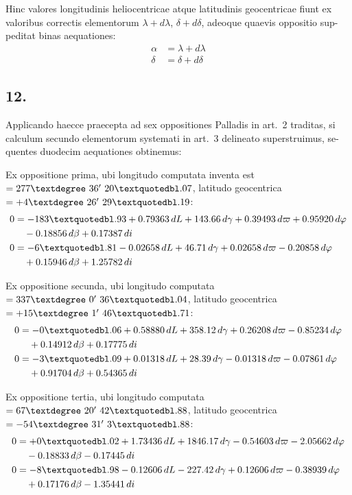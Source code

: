 \documentclass[12pt,a4paper]{article}
\begin{document}
Hinc valores longitudinis heliocentricae atque latitudinis geocentricae fiunt ex
valoribus correctis elementorum $\lambda + d\lambda$, $\delta + d\delta$, adeoque quaevis oppositio sup-
peditat binas aequationes:
\begin{align*}
\alpha &= \lambda + d\lambda \\
\delta &= \delta + d\delta
\end{align*}

\subsection*{12.}

Applicando haecce praecepta ad sex oppositiones Palladis in art.\ 2 traditas,
si calculum secundo elementorum systemati in art.\ 3 delineato superstruimus, se-
quentes duodecim aequationes obtinemus:

Ex oppositione prima, ubi longitudo computata inventa est $= 277\textdegree\ 36'\ 20\textquotedbl.07$,
latitudo geocentrica $= +4\textdegree\ 26'\ 29\textquotedbl.19$:
\begin{align*}
0 &= -183\textquotedbl.93 + 0.79363\,dL + 143.66\,d\gamma + 0.39493\,d\varpi + 0.95920\,d\varphi \\
&\quad - 0.18856\,d\beta + 0.17387\,di \\
0 &= -6\textquotedbl.81 - 0.02658\,dL + 46.71\,d\gamma + 0.02658\,d\varpi - 0.20858\,d\varphi \\
&\quad + 0.15946\,d\beta + 1.25782\,di
\end{align*}

Ex oppositione secunda, ubi longitudo computata $= 337\textdegree\ 0'\ 36\textquotedbl.04$,
latitudo geocentrica $= +15\textdegree\ 1'\ 46\textquotedbl.71$:
\begin{align*}
0 &= -0\textquotedbl.06 + 0.58880\,dL + 358.12\,d\gamma + 0.26208\,d\varpi - 0.85234\,d\varphi \\
&\quad + 0.14912\,d\beta + 0.17775\,di \\
0 &= -3\textquotedbl.09 + 0.01318\,dL + 28.39\,d\gamma - 0.01318\,d\varpi - 0.07861\,d\varphi \\
&\quad + 0.91704\,d\beta + 0.54365\,di
\end{align*}

Ex oppositione tertia, ubi longitudo computata $= 67\textdegree\ 20'\ 42\textquotedbl.88$,
latitudo geocentrica $= -54\textdegree\ 31'\ 3\textquotedbl.88$:
\begin{align*}
0 &= +0\textquotedbl.02 + 1.73436\,dL + 1846.17\,d\gamma - 0.54603\,d\varpi - 2.05662\,d\varphi \\
&\quad - 0.18833\,d\beta - 0.17445\,di \\
0 &= -8\textquotedbl.98 - 0.12606\,dL - 227.42\,d\gamma + 0.12606\,d\varpi - 0.38939\,d\varphi \\
&\quad + 0.17176\,d\beta - 1.35441\,di
\end{align*}
\end{document}
